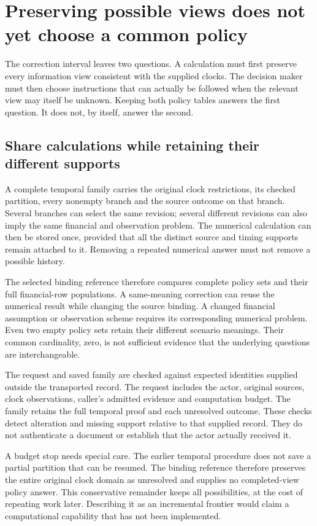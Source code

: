 \section{Preserving possible views does not yet choose a common policy}
\label{sim:temporal-family-policies}

The correction interval leaves two questions. A calculation must first preserve every information view consistent with the supplied clocks. The decision maker must then choose instructions that can actually be followed when the relevant view may itself be unknown. Keeping both policy tables answers the first question. It does not, by itself, answer the second.

\subsection{Share calculations while retaining their different supports}

A complete temporal family carries the original clock restrictions, its checked partition, every nonempty branch and the source outcome on that branch. Several branches can select the same revision; several different revisions can also imply the same financial and observation problem. The numerical calculation can then be stored once, provided that all the distinct source and timing supports remain attached to it. Removing a repeated numerical answer must not remove a possible history.

The selected binding reference therefore compares complete policy sets and their full financial-row populations. A same-meaning correction can reuse the numerical result while changing the source binding. A changed financial assumption or observation scheme requires its corresponding numerical problem. Even two empty policy sets retain their different scenario meanings. Their common cardinality, zero, is not sufficient evidence that the underlying questions are interchangeable.

The request and saved family are checked against expected identities supplied outside the transported record. The request includes the actor, original sources, clock observations, caller's admitted evidence and computation budget. The family retains the full temporal proof and each unresolved outcome. These checks detect alteration and missing support relative to that supplied record. They do not authenticate a document or establish that the actor actually received it.

A budget stop needs special care. The earlier temporal procedure does not save a partial partition that can be resumed. The binding reference therefore preserves the entire original clock domain as unresolved and supplies no completed-view policy answer. This conservative remainder keeps all possibilities, at the cost of repeating work later. Describing it as an incremental frontier would claim a computational capability that has not been implemented.

